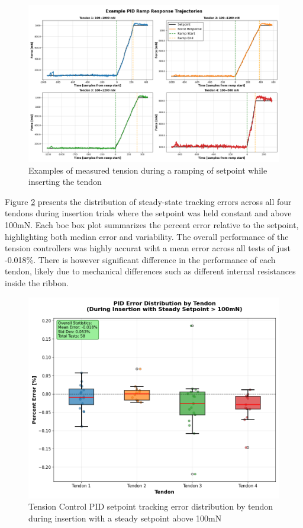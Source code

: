\begin{figure} [H]
    \centering
    \includegraphics[width=\linewidth]{images/PID performance/rampExamples.png}
    \caption{Examples of measured tension during a ramping of setpoint while inserting the tendon}
    \label{fig:rampresponse}
\end{figure}

Figure \ref{fig:PIDErrorDistByTendon} presents the distribution of steady-state tracking errors across all four tendons during insertion trials where the setpoint was held constant and above 100mN. Each boc box plot summarizes the percent error relative to the setpoint, highlighting both median error and variability. The overall performance of the tension controllers was highly accurat wiht a mean error across all tests of just -0.018\%. There is however significant difference in the performance of each tendon, likely due to mechanical differences such as different internal resistances inside the ribbon.

\begin{figure} [H]
    \centering
    \includegraphics[width=0.9\linewidth]{images/PID performance/PIDErrorDistByTendon.png}
    \caption{Tension Control PID setpoint tracking error distribution by tendon during insertion with a steady setpoint above 100mN}
    \label{fig:PIDErrorDistByTendon}
\end{figure}

